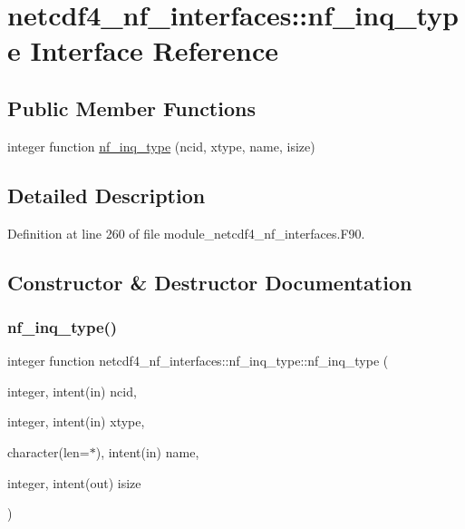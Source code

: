 \hypertarget{interfacenetcdf4__nf__interfaces_1_1nf__inq__type}{}\section{netcdf4\+\_\+nf\+\_\+interfaces\+:\+:nf\+\_\+inq\+\_\+type Interface Reference}
\label{interfacenetcdf4__nf__interfaces_1_1nf__inq__type}
\subsection*{Public Member Functions}
\begin{DoxyCompactItemize}
\item 
integer function \hyperlink{interfacenetcdf4__nf__interfaces_1_1nf__inq__type_a840ff4f58d4c6394768828116b1ff531}{nf\+\_\+inq\+\_\+type} (ncid, xtype, name, isize)
\end{DoxyCompactItemize}


\subsection{Detailed Description}


Definition at line 260 of file module\+\_\+netcdf4\+\_\+nf\+\_\+interfaces.\+F90.



\subsection{Constructor \& Destructor Documentation}
\mbox{\label{interfacenetcdf4__nf__interfaces_1_1nf__inq__type_a840ff4f58d4c6394768828116b1ff531}} 
\subsubsection{\texorpdfstring{nf\+\_\+inq\+\_\+type()}{nf\_inq\_type()}}
{\footnotesize\ttfamily integer function netcdf4\+\_\+nf\+\_\+interfaces\+::nf\+\_\+inq\+\_\+type\+::nf\+\_\+inq\+\_\+type (\begin{DoxyParamCaption}\item[{integer, intent(in)}]{ncid,  }\item[{integer, intent(in)}]{xtype,  }\item[{character(len=$\ast$), intent(in)}]{name,  }\item[{integer, intent(out)}]{isize }\end{DoxyParamCaption})}



